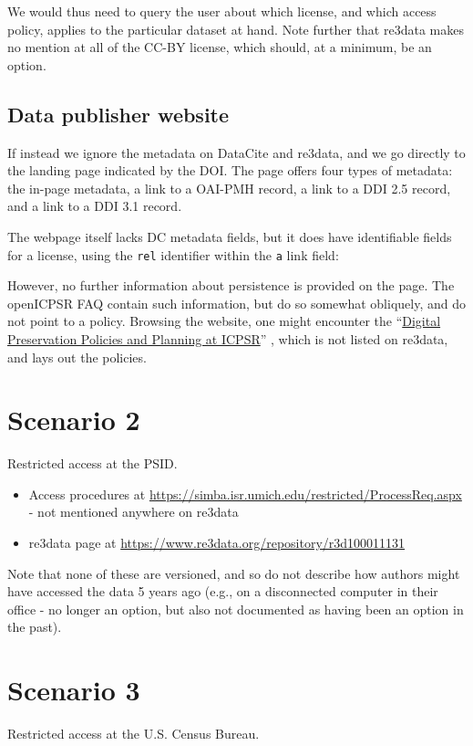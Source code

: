 \documentclass[10pt,letterpaper]{article}
\begin{document}
We would thus need to query the user about which license, and which access policy, applies to the particular dataset at hand. Note further that re3data makes no mention at all of the CC-BY license, which should, at a minimum, be an option.

\subsection{Data publisher website}
If instead we ignore the metadata on DataCite and re3data, and we go directly to the landing page indicated by the \ac{DOI}. The page offers four types of metadata: the in-page metadata, a link to a OAI-PMH record, a link to a DDI 2.5 record, and a link to a DDI 3.1 record.

The webpage itself lacks \ac{DC} metadata fields, but it does have identifiable fields for a license, using the \texttt{rel} identifier within the \lstinline|a| link field:


However, no further information about persistence is provided on the page. The openICPSR FAQ contain such information, but do so somewhat obliquely, and do not point to a policy. Browsing the website, one might encounter the ``\href{https://www.icpsr.umich.edu/icpsrweb/content/datamanagement/preservation/policies/index.html}{Digital Preservation Policies and Planning at ICPSR}'' \parencite{icpsr-preservation}, which is not listed on re3data, and lays out the policies. 

\section{Scenario 2}
Restricted access at the \ac{PSID}. 
\begin{itemize}
	\item Access procedures at \url{https://simba.isr.umich.edu/restricted/ProcessReq.aspx}  - not mentioned anywhere on re3data
	\item re3data page at \url{https://www.re3data.org/repository/r3d100011131}
\end{itemize}
Note that none of these are versioned, and so do not describe how authors might have accessed the data 5 years ago (e.g., on a disconnected computer in their office - no longer an option, but also not documented as having been an option in the past).

\section{Scenario 3}
Restricted access at the U.S. Census Bureau.

%
%
\end{document}
